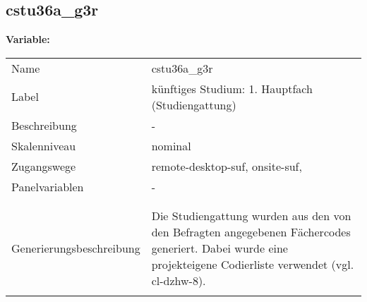 	
	
	\subsection{cstu36a\_g3r}
	\label{subSection:cstu36a_g3r}

	\noindent\textbf{Variable:}\\
		\begin{tabular}{lL{11.3cm}}
			\label{tableVariable:cstu36a_g3r}
			Name & cstu36a\_g3r \\
			Label & künftiges Studium: 1. Hauptfach (Studiengattung) \\
			Beschreibung & - \\
			Skalenniveau & nominal \\
			Zugangswege &
				remote-desktop-suf,
				onsite-suf,
 \\
			Panelvariablen & -
			 \\
			 \\
 \\
					Generierungsbeschreibung & Die Studiengattung wurden aus den von den Befragten angegebenen Fächercodes generiert.  Dabei wurde eine projekteigene Codierliste verwendet (vgl. cl-dzhw-8).
				 \\	
			 \\
		\end{tabular}






